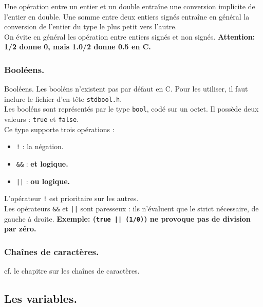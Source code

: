\documentclass[french, 11pt]{article}
\begin{document}
\begin{defi}{}{}
    Une opération entre un entier et un double entraîne une conversion implicite de l'entier en double. Une somme entre deux entiers signés entraîne en général la conversion de l'entier du type le plus petit vers l'autre.\\
    On évite en général les opération entre entiers signés et non signés.\n
    \bf{Attention:} 1/2 donne 0, mais 1.0/2 donne 0.5 en C.
\end{defi}

\subsubsection{Booléens.}
\begin{defi}{Booléens.}{}
    Les booléns n'existent pas par défaut en C. Pour les utiliser, il faut inclure le fichier d'en-tête \texttt{stdbool.h}.\\
    Les booléns sont représentés par le type \texttt{bool}, codé sur un octet. Il possède deux valeurs : \texttt{true} et \texttt{false}.\\
    Ce type supporte trois opérations :
    \begin{itemize}[topsep=0pt,itemsep=-0.9 ex, label=---]
        \item \texttt{!} : la négation.
        \item \texttt{\&\&} : \bf{et} logique.
        \item \texttt{||} : \bf{ou} logique.
    \end{itemize}
    L'opérateur \texttt{!} est prioritaire sur les autres.\\
    Les opérateurs \texttt{\&\&} et \texttt{||} sont paresseux : ils n'évaluent que le strict nécessaire, de gauche à droite.\n
    \bf{Exemple:} (\texttt{true || (1/0)}) ne provoque pas de division par zéro.
\end{defi}

\subsubsection{Chaînes de caractères.}

\begin{center}
    cf. le chapitre sur les chaînes de caractères.
\end{center}

\subsection{Les variables.}
\end{document}

